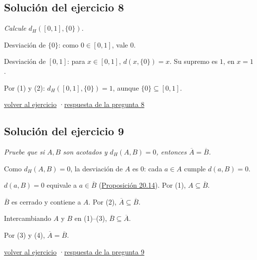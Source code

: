 \documentclass[11pt,a4paper]{article}
\newcommand{\cl}[1]{\overline{#1}}\newcommand{\norm}[1]{\lVert #1\rVert}\newcommand{\abs}[1]{\lvert #1\rvert}
\begin{document}
\subsection*{\hypertarget{s-8}{}Solución del ejercicio 8}
\emph{Calcule $d_H([0,1],\{0\})$.}
\begin{pasos}
\item[(1)] Desviación de $\{0\}$: como $0\in[0,1]$, vale $0$.
\item[(2)] Desviación de $[0,1]$: para $x\in[0,1]$, $d(x,\{0\})=x$. Su supremo es $1$, en $x=1$.
\item[] Por (1) y (2): $d_H([0,1],\{0\})=1$, aunque $\{0\}\subseteq[0,1]$.
\end{pasos}
\par{\small \hyperlink{x-8}{volver al ejercicio} \quad·\quad \hyperlink{r-8}{respuesta de la pregunta 8}}
\subsection*{\hypertarget{s-9}{}Solución del ejercicio 9}
\emph{Pruebe que si $A,B$ son acotados y $d_H(A,B)=0$, entonces $\cl A=\cl B$.}
\begin{pasos}
\item[(1)] Como $d_H(A,B)=0$, la desviación de $A$ es $0$: cada $a\in A$ cumple $d(a,B)=0$.
\item[(2)] $d(a,B)=0$ equivale a $a\in\cl B$ (\href{https://decostruttivismo.github.io/MAT2514-repaso/pdf/MAT2514_apuntes_completos.pdf\#nameddest=teorema.20.14}{Proposición 20.14}). Por (1), $A\subseteq\cl B$.
\item[(3)] $\cl B$ es cerrado y contiene a $A$. Por (2), $\cl A\subseteq\cl B$.
\item[(4)] Intercambiando $A$ y $B$ en (1)–(3), $\cl B\subseteq\cl A$.
\item[] Por (3) y (4), $\cl A=\cl B$.
\end{pasos}
\par{\small \hyperlink{x-9}{volver al ejercicio} \quad·\quad \hyperlink{r-9}{respuesta de la pregunta 9}}
\end{document}
